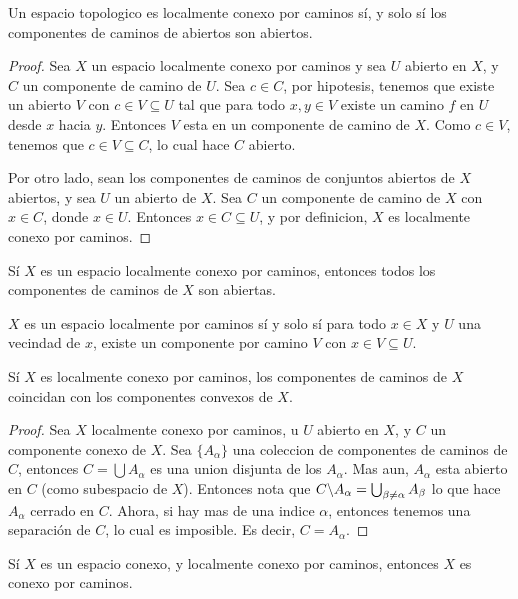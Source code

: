 \begin{theorem}\label{9.21}
    Un espacio topologico es localmente conexo por caminos s\'i, y solo s\'i los
    componentes de caminos de abiertos son abiertos.
\end{theorem}
\begin{proof}
    Sea $X$ un espacio localmente conexo por caminos y sea  $U$ abierto en $X$,
    y $C$ un componente de camino de  $U$. Sea  $c \in C$, por hipotesis,
    tenemos que existe un abierto  $V$ con  $c \in V \subseteq U$ tal que para
    todo  $x,y \in V$ existe un camino $f$ en $U$ desde  $x$ hacia  $y$.
    Entonces  $V$ esta en un componente de camino de $X$. Como $c \in V$,
    tenemos que  $c \in V \subseteq C$, lo cual hace  $C$ abierto.

    Por otro lado, sean los componentes de caminos de conjuntos abiertos de $X$
    abiertos, y sea $U$ un abierto de  $X$. Sea $C$ un componente de camino de
    $X$ con $x \in C$, donde  $x \in U$. Entonces  $x \in C \subseteq U$, y por
    definicion, $X$ es localmente conexo por caminos.
\end{proof}
\begin{corollary}
    S\'i $X$ es un espacio localmente conexo por caminos, entonces
    todos los componentes de caminos de  $X$ son abiertas.
\end{corollary}
\begin{corollary}
    $X$ es un espacio localmente por caminos s\'i y solo s\'i para todo  $x \in
    X$ y  $U$ una vecindad de  $x$, existe un componente por camino $V$ con  $x
    \in V \subseteq U$.
\end{corollary}
\begin{corollary}
    S\'i $X$ es localmente conexo por caminos, los componentes de caminos de
    $X$ coincidan con los componentes convexos de  $X$.
\end{corollary}
\begin{proof}
    Sea $X$ localmente conexo por caminos, u  $U$ abierto en  $X$, y  $C$ un
    componente conexo de $X$. Sea $\{A_\alpha\}$ una coleccion de componentes
    de caminos de $C$, entonces  $C=\bigcup{A_{\alpha}}$ es una union disjunta
    de los $A_\alpha$. Mas aun,  $A_\alpha$ esta abierto en $C$ (como subespacio
    de $X$). Entonces nota que $C\backslash A_\alpha=\bigcup_{\beta \neq
    \alpha}{A_\beta}$ lo que hace $A_\alpha$ cerrado en  $C$. Ahora, si hay mas
    de una indice $\alpha$, entonces tenemos una separaci\'on de $C$, lo cual es
    imposible. Es decir, $C=A_\alpha$.
\end{proof}
\begin{corollary}
    S\'i $X$ es un espacio conexo, y localmente conexo por caminos, entonces $X$
    es conexo por caminos.
\end{corollary}

